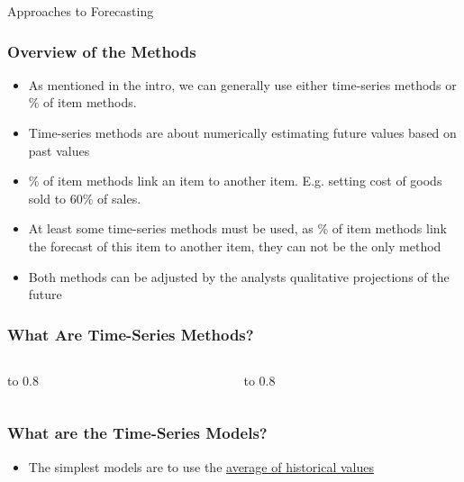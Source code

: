 \documentclass[handout, 11pt]{beamer}
\begin{document}
\begin{section}{Approaches to Forecasting}
\begin{frame}
\frametitle{Overview of the Methods}
\begin{itemize}
\item As mentioned in the intro, we can generally use either time-series methods or \% of item methods.
\vfill
\item Time-series methods are about numerically estimating future values based on past values
\vfill
\item \% of item methods link an item to another item. E.g. setting cost of goods sold to 60\% of sales.
\vfill
\item At least some time-series methods must be used, as \% of item methods link the forecast of this item to another item, they can not be the only method
\vfill
\item Both methods can be adjusted by the analysts qualitative projections of the future
\end{itemize}
\end{frame}
\begin{frame}
\frametitle{What Are Time-Series Methods?}
\begin{columns}
\begin{column}{0.5\textwidth}
\vbox to 0.8
\end{column}
\begin{column}{0.5\textwidth}
\vbox to 0.8
\end{column}
\end{columns}
\end{frame}
\begin{frame}
\frametitle{What are the Time-Series Models?}
\begin{itemize}
\item The simplest models are to use the
\underline{average of historical values}

\end{itemize}
\end{frame}
\end{section}
\end{document}
